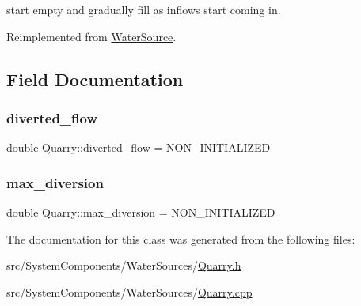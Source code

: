 start empty and gradually fill as inflows start coming in. 

Reimplemented from \mbox{\hyperlink{classWaterSource_ab3396e2915db91a6c82e0f29c7889df4_ab3396e2915db91a6c82e0f29c7889df4}{Water\+Source}}.



\subsection{Field Documentation}
\mbox{\label{classQuarry_ac2fe4ae274f23b1cc932655c5fb6263d_ac2fe4ae274f23b1cc932655c5fb6263d}} 
\subsubsection{\texorpdfstring{diverted\+\_\+flow}{diverted\_flow}}
{\footnotesize\ttfamily double Quarry\+::diverted\+\_\+flow = N\+O\+N\+\_\+\+I\+N\+I\+T\+I\+A\+L\+I\+Z\+ED\hspace{0.3cm}{\ttfamily [private]}}

\mbox{\label{classQuarry_a5cb60f94475d5991a795cb9117e0b83f_a5cb60f94475d5991a795cb9117e0b83f}} 
\subsubsection{\texorpdfstring{max\+\_\+diversion}{max\_diversion}}
{\footnotesize\ttfamily double Quarry\+::max\+\_\+diversion = N\+O\+N\+\_\+\+I\+N\+I\+T\+I\+A\+L\+I\+Z\+ED\hspace{0.3cm}{\ttfamily [private]}}



The documentation for this class was generated from the following files\+:\begin{DoxyCompactItemize}
\item 
src/\+System\+Components/\+Water\+Sources/\mbox{\hyperlink{Quarry_8h}{Quarry.\+h}}\item 
src/\+System\+Components/\+Water\+Sources/\mbox{\hyperlink{Quarry_8cpp}{Quarry.\+cpp}}\end{DoxyCompactItemize}
